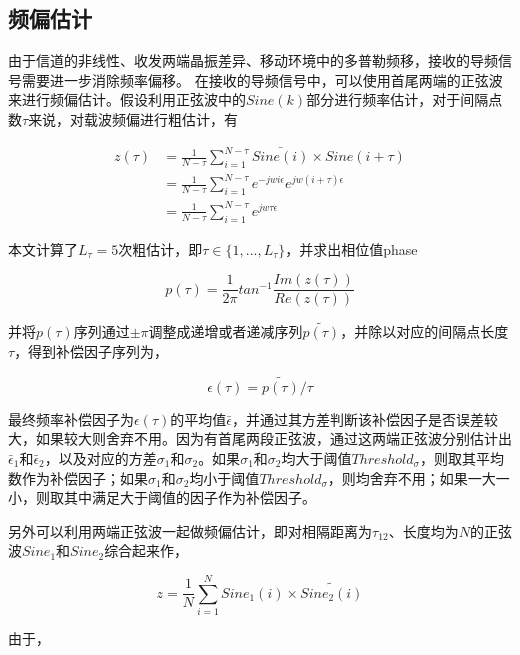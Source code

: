 \documentclass[master]{seuthesis} %
\begin{document}
\begin{Main}
\subsection{频偏估计}

由于信道的非线性、收发两端晶振差异、移动环境中的多普勒频移，接收的导频信号需要进一步消除频率偏移。
在接收的导频信号中，可以使用首尾两端的正弦波来进行频偏估计。假设利用正弦波中的$Sine(k)$部分进行频率估计，对于间隔点数$\tau$来说，对载波频偏进行粗估计，有

\begin{align}
    z(\tau) & = \frac{1}{N - \tau} \sum_{i = 1}^{N-\tau} \bar{Sine(i)} \times Sine(i + \tau) \\
    & = \frac{1}{N-\tau} \sum_{i = 1}^{N-\tau} e^{-jwi\epsilon} e^{jw(i+\tau)\epsilon} \\
    & = \frac{1}{N-\tau} \sum_{i = 1}^{N-\tau} e^{jw\tau\epsilon}
\end{align}

本文计算了$L_{\tau} = 5$次粗估计，即$\tau \in \{1,..., L_{\tau}\}$，并求出相位值phase

\begin{equation}
    p(\tau) = \frac{1}{2\pi} tan^{-1} {\frac{Im(z(\tau))}{Re(z(\tau))}}
\end{equation}

并将$p(\tau)$序列通过$\pm \pi$调整成递增或者递减序列$\tilde{p(\tau)}$，并除以对应的间隔点长度$\tau$，得到补偿因子序列为，

\begin{equation}
    \epsilon(\tau) = \tilde{p(\tau)} / \tau
\end{equation}

最终频率补偿因子为$\epsilon(\tau)$的平均值$\bar{\epsilon}$，并通过其方差判断该补偿因子是否误差较大，如果较大则舍弃不用。因为有首尾两段正弦波，通过这两端正弦波分别估计出$\bar{\epsilon}_1$和$\bar{\epsilon}_2$，以及对应的方差$\sigma_1$和$\sigma_2$。如果$\sigma_1$和$\sigma_2$均大于阈值$Threshold_{\sigma}$，则取其平均数作为补偿因子；如果$\sigma_1$和$\sigma_2$均小于阈值$Threshold_\sigma$，则均舍弃不用；如果一大一小，则取其中满足大于阈值的因子作为补偿因子。

另外可以利用两端正弦波一起做频偏估计，即对相隔距离为$\tau_{12}$、长度均为$N$的正弦波$Sine_1$和$Sine_2$综合起来作，

\begin{equation}
    z = \frac{1}{N} \sum_{i=1}^N Sine_1(i) \times \tilde{Sine_2(i)}
\end{equation}

由于，


\end{Main}
\end{document}
